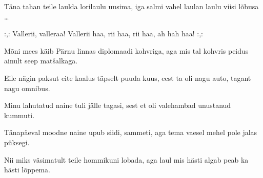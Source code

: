 T\"ana tahan teile laulda
lorilaulu uusima,
iga salmi vahel laulan
laulu viisi l\~obusa \ldots

 :,: Vallerii, valleraa!
 Vallerii haa, rii haa, rii haa, ah hah haa! :,: 

M\~oni mees k\"aib P\"arnu linnas
diplomaadi kohvriga,
aga mis tal kohvris peidus
ainult seep mat\v{s}alkaga.

Eile n\"agin paksut eite
kaalus t\"apselt puuda kuus,
eest ta oli nagu auto,
tagant nagu omnibus.

Minu lahutatud naine
tuli j\"alle tagasi,
sest et oli valehambad
unustanud kummuti.

T\"anap\"aeval moodne naine
upub siidi, sammeti,
aga tema vaesel mehel
pole jalas p\"uksegi.

Nii miks v\"asimatult teile
hommikuni lobada,
aga laul mis h\"asti algab
peab ka h\"asti l\~oppema.